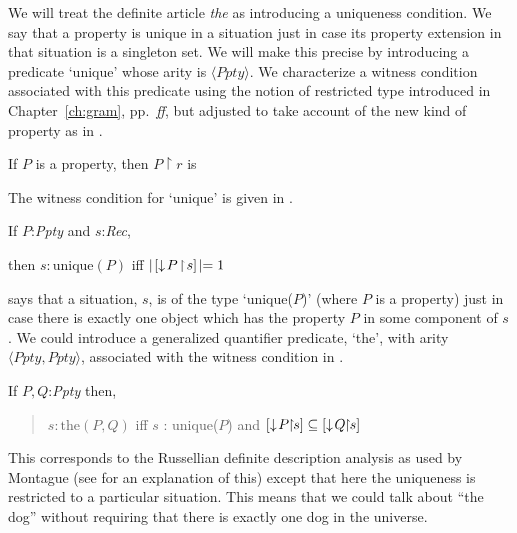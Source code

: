 We will treat the definite article \textit{the} as introducing a
uniqueness condition.  We say that a property is unique in a situation
just in case its property extension in that situation is a singleton
set.  We will make this precise by introducing a predicate `unique'
whose arity is $\langle\textit{Ppty}\rangle$.  We characterize a
witness condition associated with this predicate using the notion of
restricted type introduced in Chapter~\ref{ch:gram},
pp.~\pageref{pg:restfld}\textit{ff}, but adjusted to take account of
the new kind of property as in \nexteg{}.
\begin{ex} 
  If $P$ is a property, then $P\!\restriction\!r$ is
  \begin{quote}
  \end{quote}
  
\end{ex} 
  

The witness condition for `unique' is given in \nexteg{}.
\begin{ex} 
If $P$:\textit{Ppty} and $s$:\textit{Rec}, 

\hspace*{1em} then $s:\textrm{unique}(P)$ iff
  $\mid\![\downarrow\!P\!\restriction\!s]\!\mid = 1$  
\end{ex}
\preveg{} says that a situation, $s$, is of the type `unique($P$)'
(where $P$ is a property) just in case there is exactly one object
which has the property $P$ in some component of $s$.  We could
introduce a generalized quantifier predicate, `the', with arity
$\langle\textit{Ppty},\textit{Ppty}\rangle$, associated with the
witness condition in \nexteg{}.
\begin{ex} 
If $P,Q$:\textit{Ppty} then, 
\begin{quote}
 $s:\mathrm{the}(P,Q)$ iff
 $s$ : unique($P$)
  and
  $\downP{P\!\!\restriction\!\!s}\subseteq\downP{Q\!\!\restriction\!\!s}$
\end{quote}

\end{ex} 
This corresponds to the Russellian definite description analysis as
used by Montague (see \citealp{DowtyWallPeters1981} for an explanation of
this) except that here the uniqueness is restricted to a particular
situation.  This means that we could talk about ``the dog'' without
requiring that there is exactly one dog in the universe.

